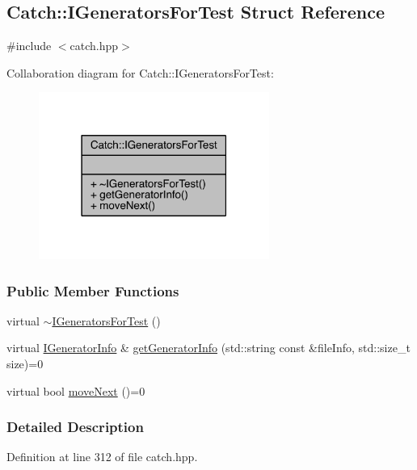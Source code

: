 \hypertarget{a00036}{}\subsection{Catch\+:\+:I\+Generators\+For\+Test Struct Reference}
\label{a00036}


{\ttfamily \#include $<$catch.\+hpp$>$}



Collaboration diagram for Catch\+:\+:I\+Generators\+For\+Test\+:\nopagebreak
\begin{figure}[H]
\begin{center}
\leavevmode
\includegraphics[width=214pt]{a00205}
\end{center}
\end{figure}
\subsubsection*{Public Member Functions}
\begin{DoxyCompactItemize}
\item 
virtual \hyperlink{a00036_a05725e76ee92e498f73479a61f3e3c7c}{$\sim$\+I\+Generators\+For\+Test} ()
\item 
virtual \hyperlink{a00035}{I\+Generator\+Info} \& \hyperlink{a00036_a180d84e858840188e4c3788e47eefdb0}{get\+Generator\+Info} (std\+::string const \&file\+Info, std\+::size\+\_\+t size)=0
\item 
virtual bool \hyperlink{a00036_adab31832d529fc584fd63164e0a1c8ad}{move\+Next} ()=0
\end{DoxyCompactItemize}


\subsubsection{Detailed Description}


Definition at line 312 of file catch.\+hpp.



